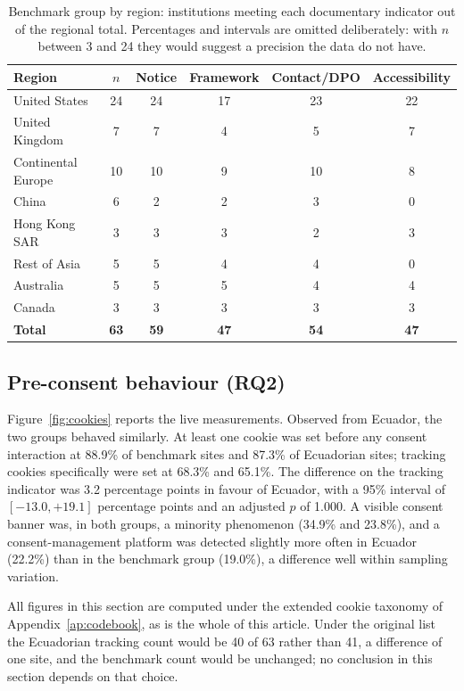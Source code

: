 \documentclass[pdflatex,sn-basic,Numbered,iicol]{sn-jnl}
\theoremstyle{thmstyleone}
\theoremstyle{thmstyletwo}
\theoremstyle{thmstylethree}
\begin{document}
	\begin{table}[htbp]
		\centering
		\caption{Benchmark group by region: institutions meeting each documentary indicator out of the regional total. Percentages and intervals are omitted deliberately: with $n$ between 3 and 24 they would suggest a precision the data do not have.}\label{tab:reg}
		\small
		\begin{tabular}{@{}lccccc@{}}
			\toprule
			\textbf{Region} & \textbf{$n$} & \textbf{Notice} & \textbf{Framework} & \textbf{Contact/DPO} & \textbf{Accessibility} \\
			\midrule
			United States & 24 & 24 & 17 & 23 & 22 \\
			United Kingdom & 7 & 7 & 4 & 5 & 7 \\
			Continental Europe & 10 & 10 & 9 & 10 & 8 \\
			China & 6 & 2 & 2 & 3 & 0 \\
			Hong Kong SAR & 3 & 3 & 3 & 2 & 3 \\
			Rest of Asia & 5 & 5 & 4 & 4 & 0 \\
			Australia & 5 & 5 & 5 & 4 & 4 \\
			Canada & 3 & 3 & 3 & 3 & 3 \\
			\midrule
			\textbf{Total} & \textbf{63} & \textbf{59} & \textbf{47} & \textbf{54} & \textbf{47} \\
			\bottomrule
		\end{tabular}
	\end{table}
	
	\subsection{Pre-consent behaviour (RQ2)}\label{sec:results-cookies}
	
	Figure~\ref{fig:cookies} reports the live measurements. Observed from Ecuador, the two groups behaved similarly. At least one cookie was set before any consent interaction at 88.9\% of benchmark sites and 87.3\% of Ecuadorian sites; tracking cookies specifically were set at 68.3\% and 65.1\%. The difference on the tracking indicator was 3.2 percentage points in favour of Ecuador, with a 95\% interval of $[-13.0, +19.1]$ percentage points and an adjusted $p$ of 1.000. A visible consent banner was, in both groups, a minority phenomenon (34.9\% and 23.8\%), and a consent-management platform was detected slightly more often in Ecuador (22.2\%) than in the benchmark group (19.0\%), a difference well within sampling variation.
	
	All figures in this section are computed under the extended cookie taxonomy of Appendix~\ref{ap:codebook}, as is the whole of this article. Under the original list the Ecuadorian tracking count would be 40 of 63 rather than 41, a difference of one site, and the benchmark count would be unchanged; no conclusion in this section depends on that choice.
	
\end{document}
